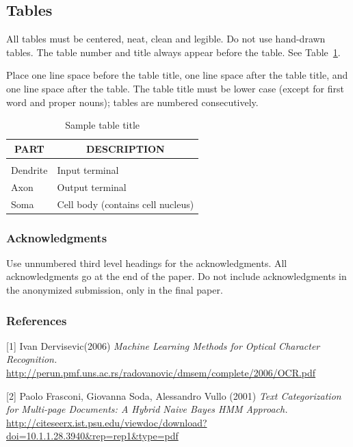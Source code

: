 \documentclass{article} %
\begin{document}
\subsection{Tables}

All tables must be centered, neat, clean and legible. Do not use hand-drawn
tables. The table number and title always appear before the table. See
Table~\ref{sample-table}.

Place one line space before the table title, one line space after the table
title, and one line space after the table. The table title must be lower case
(except for first word and proper nouns); tables are numbered consecutively.

\begin{table}[t]
\caption{Sample table title}
\label{sample-table}
\begin{center}
\begin{tabular}{ll}
\multicolumn{1}{c}{\bf PART}  &\multicolumn{1}{c}{\bf DESCRIPTION}
\\ \hline \\
Dendrite         &Input terminal \\
Axon             &Output terminal \\
Soma             &Cell body (contains cell nucleus) \\
\end{tabular}
\end{center}
\end{table}


\subsubsection*{Acknowledgments}

Use unnumbered third level headings for the acknowledgments. All
acknowledgments go at the end of the paper. Do not include 
acknowledgments in the anonymized submission, only in the 
final paper. 

\subsubsection*{References}

\small{
[1] Ivan Dervisevic(2006) {\it Machine Learning Methods for Optical Character Recognition.} \url{http://perun.pmf.uns.ac.rs/radovanovic/dmsem/complete/2006/OCR.pdf}

[2] Paolo Frasconi, Giovanna Soda, Alessandro Vullo (2001) {\it Text Categorization for Multi-page Documents: A Hybrid Naive Bayes HMM Approach.} \url{http://citeseerx.ist.psu.edu/viewdoc/download?doi=10.1.1.28.3940&rep=rep1&type=pdf}
}
\end{document}
